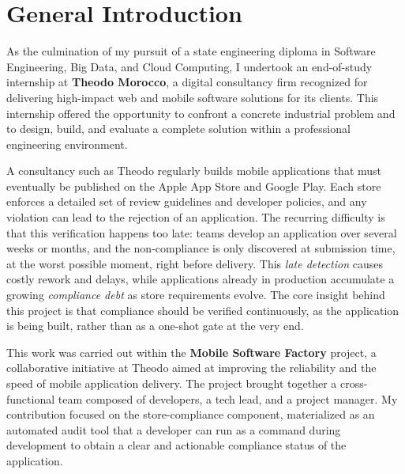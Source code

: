 \chapter*{\Huge General Introduction}

As the culmination of my pursuit of a state engineering diploma in Software Engineering, Big Data, and Cloud Computing, I undertook an end-of-study internship at \textbf{Theodo Morocco}, a digital consultancy firm recognized for delivering high-impact web and mobile software solutions for its clients. This internship offered the opportunity to confront a concrete industrial problem and to design, build, and evaluate a complete solution within a professional engineering environment.

\vspace{0.3cm}

A consultancy such as Theodo regularly builds mobile applications that must eventually be published on the Apple App Store and Google Play. Each store enforces a detailed set of review guidelines and developer policies, and any violation can lead to the rejection of an application. The recurring difficulty is that this verification happens too late: teams develop an application over several weeks or months, and the non-compliance is only discovered at submission time, at the worst possible moment, right before delivery. This \textit{late detection} causes costly rework and delays, while applications already in production accumulate a growing \textit{compliance debt} as store requirements evolve. The core insight behind this project is that compliance should be verified continuously, as the application is being built, rather than as a one-shot gate at the very end.

\vspace{0.3cm}

This work was carried out within the \textbf{Mobile Software Factory} project, a collaborative initiative at Theodo aimed at improving the reliability and the speed of mobile application delivery. The project brought together a cross-functional team composed of developers, a tech lead, and a project manager. My contribution focused on the store-compliance component, materialized as an automated audit tool that a developer can run as a command during development to obtain a clear and actionable compliance status of the application.

\vspace{0.3cm}

